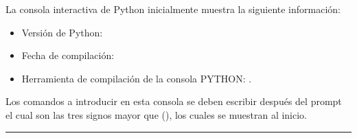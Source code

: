 \documentclass[letterpaper,10pt,spanish]{sphinxmanual}
\begin{document}
\sphinxAtStartPar
La consola interactiva de Python inicialmente muestra la siguiente información:
\begin{itemize}
\item {} 
\sphinxAtStartPar
Versión de Python: 

\item {} 
\sphinxAtStartPar
Fecha de compilación: 

\item {} 
\sphinxAtStartPar
Herramienta de compilación de la consola PYTHON: .

\end{itemize}

\sphinxAtStartPar
Los comandos a introducir en esta consola se deben escribir después del prompt el cual son las tres signos mayor que (\sphinxcode{\sphinxupquote{>>>}}), los cuales se muestran al inicio.


\bigskip\hrule\bigskip
\end{document}
